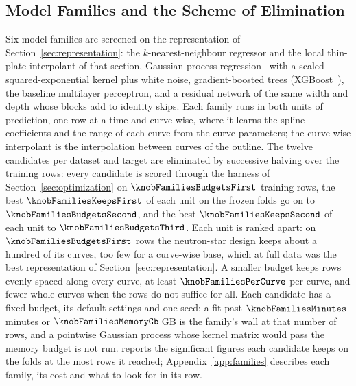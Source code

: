 \subsection{Model Families and the Scheme of Elimination}
\label{sec:families}

Six model families are screened on the representation of Section~\ref{sec:representation}: the $k$-nearest-neighbour regressor and the local thin-plate interpolant of that section, Gaussian process regression~\citep{Rasmussen2005_GP} with a scaled squared-exponential kernel plus white noise, gradient-boosted trees (XGBoost~\citep{TODO_XGBoost}), the baseline multilayer perceptron, and a residual network of the same width and depth whose blocks add to identity skips. Each family runs in both units of prediction, one row at a time and curve-wise, where it learns the spline coefficients and the range of each curve from the curve parameters; the curve-wise interpolant is the interpolation between curves of the outline. The twelve candidates per dataset and target are eliminated by successive halving over the training rows: every candidate is scored through the harness of Section~\ref{sec:optimization} on $\knobFamiliesBudgetsFirst$ training rows, the best $\knobFamiliesKeepsFirst$ of each unit on the frozen folds go on to $\knobFamiliesBudgetsSecond$, and the best $\knobFamiliesKeepsSecond$ of each unit to $\knobFamiliesBudgetsThird$. Each unit is ranked apart: on $\knobFamiliesBudgetsFirst$ rows the neutron-star design keeps about a hundred of its curves, too few for a curve-wise base, which at full data was the best representation of Section~\ref{sec:representation}. A smaller budget keeps rows evenly spaced along every curve, at least $\knobFamiliesPerCurve$ per curve, and fewer whole curves when the rows do not suffice for all. Each candidate has a fixed budget, its default settings and one seed; a fit past $\knobFamiliesMinutes$ minutes or $\knobFamiliesMemoryGb$\,GB is the family's wall at that number of rows, and a pointwise Gaussian process whose kernel matrix would pass the memory budget is not run.  reports the significant figures each candidate keeps on the folds at the most rows it reached; Appendix~\ref{app:families} describes each family, its cost and what to look for in its row.


